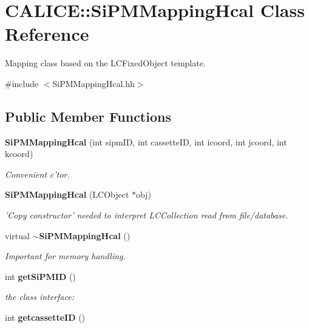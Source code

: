 \section{CALICE::SiPMMappingHcal Class Reference}
\label{classCALICE_1_1SiPMMappingHcal}


Mapping class based on the LCFixedObject template.  


{\ttfamily \#include $<$SiPMMappingHcal.hh$>$}\subsection*{Public Member Functions}
\begin{DoxyCompactItemize}
\item 
{\bf SiPMMappingHcal} (int sipmID, int cassetteID, int icoord, int jcoord, int kcoord)\label{classCALICE_1_1SiPMMappingHcal_ae2765c68cb961dfc57d5d9ad5dbd2490}

\begin{DoxyCompactList}\small\item\em Convenient c'tor. \item\end{DoxyCompactList}\item 
{\bf SiPMMappingHcal} (LCObject $\ast$obj)\label{classCALICE_1_1SiPMMappingHcal_ab59441ec2da70fd03254187e96de4fc8}

\begin{DoxyCompactList}\small\item\em 'Copy constructor' needed to interpret LCCollection read from file/database. \item\end{DoxyCompactList}\item 
virtual {\bf $\sim$SiPMMappingHcal} ()\label{classCALICE_1_1SiPMMappingHcal_a8164d7985b5b1d0feca49629168dfdd0}

\begin{DoxyCompactList}\small\item\em Important for memory handling. \item\end{DoxyCompactList}\item 
int {\bf getSiPMID} ()\label{classCALICE_1_1SiPMMappingHcal_ab0a627ff9ea7889c099a010f68a68048}

\begin{DoxyCompactList}\small\item\em the class interface: \item\end{DoxyCompactList}\item 
int {\bfseries getcassetteID} ()\label{classCALICE_1_1SiPMMappingHcal_a3a828d20006a04488b21cfb3bd23f1bb}


\end{DoxyCompactItemize}
